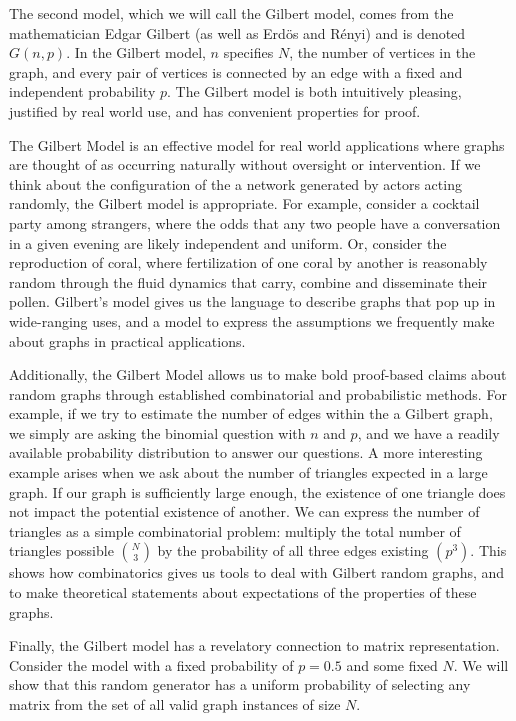 The second model, which we will call the Gilbert model, comes from the mathematician Edgar Gilbert (as well as Erd\"os and R\'enyi) and is denoted $G(n, p)$.
In the Gilbert model, $n$ specifies $N$, the number of vertices in the graph, and every pair of vertices is connected by an edge with a fixed and independent probability $p$.
The Gilbert model is both intuitively pleasing, justified by real world use, and has convenient properties for proof.

The Gilbert Model is an effective model for real world applications where graphs are thought of as occurring naturally without oversight or intervention.
If we think about the configuration of the a network generated by actors acting randomly, the Gilbert model is appropriate.
For example, consider a cocktail party among strangers, where the odds that any two people have a conversation in a given evening are likely independent and uniform.
Or, consider the reproduction of coral, where fertilization of one coral by another is reasonably random through the fluid dynamics that carry, combine and disseminate their pollen.
Gilbert's model gives us the language to describe graphs that pop up in wide-ranging uses, and a model to express the assumptions we frequently make about graphs in practical applications.

Additionally, the Gilbert Model allows us to make bold proof-based claims about random graphs through established combinatorial and probabilistic methods.
For example, if we try to estimate the number of edges within the a Gilbert graph, we simply are asking the binomial question with $n$ and $p$, and we have a readily available probability distribution to answer our questions.
A more interesting example arises when we ask about the number of triangles expected in a large graph.
If our graph is sufficiently large enough, the existence of one triangle does not impact the potential existence of another.
We can express the number of triangles as a simple combinatorial problem: multiply the total number of triangles possible $\binom{N}{3}$ by the probability of all three edges existing $(p^3)$.
This shows how combinatorics gives us tools to deal with Gilbert random graphs, and to make theoretical statements about expectations of the properties of these graphs.

Finally, the Gilbert model has a revelatory connection to matrix representation.
Consider the model with a fixed probability of $p=0.5$ and some fixed $N$.
We will show that this random generator has a uniform probability of selecting any matrix from the set of all valid graph instances of size $N$.

